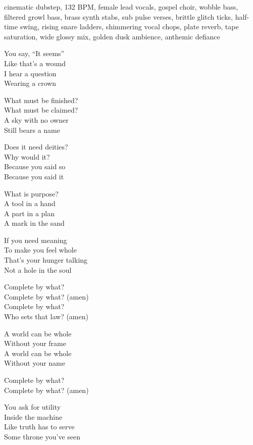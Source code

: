 
\begin{notes}
\end{notes}
\begin{style}
cinematic dubstep, 132 BPM, female lead vocals, gospel choir, wobble bass, filtered growl bass, brass synth stabs, sub pulse verses, brittle glitch ticks, half-time swing, rising snare ladders, shimmering vocal chops, plate reverb, tape saturation, wide glossy mix, golden dusk ambience, anthemic defiance
\end{style}
\begin{lyrics}
You say, “It seems”\\
Like that’s a wound\\
I hear a question\\
Wearing a crown

What must be finished?\\
What must be claimed?\\
A sky with no owner\\
Still bears a name

Does it need deities?\\
Why would it?\\
Because you said so\\
Because you said it

What is purpose?\\
A tool in a hand\\
A part in a plan\\
A mark in the sand

If you need meaning\\
To make you feel whole\\
That’s your hunger talking\\
Not a hole in the soul

Complete by what?\\
Complete by what? (amen)\\
Complete by what?\\
Who sets that law? (amen)

A world can be whole\\
Without your frame\\
A world can be whole\\
Without your name

Complete by what?\\
Complete by what? (amen)

You ask for utility\\
Inside the machine\\
Like truth has to serve\\
Some throne you’ve seen


\end{lyrics}

